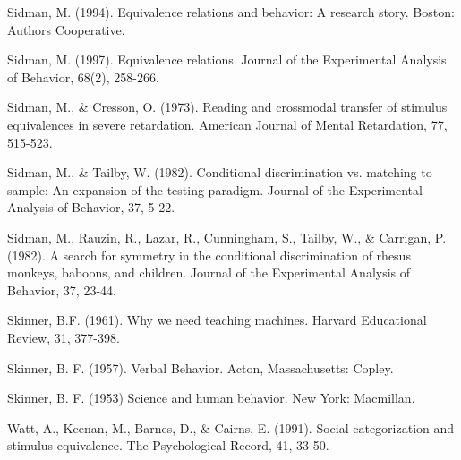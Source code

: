 \hangindent=25pt
\noindent Sidman, M. (1994). Equivalence relations and behavior: A research story. Boston: Authors Cooperative.

\hangindent=25pt
\noindent Sidman, M. (1997). Equivalence relations. Journal of the Experimental Analysis of Behavior, 68(2), 258-266.

\hangindent=25pt
\noindent Sidman, M., \& Cresson, O. (1973). Reading and crossmodal transfer of stimulus equivalences in severe retardation. American Journal of Mental Retardation, 77, 515-523.

\hangindent=25pt
\noindent Sidman, M., \& Tailby, W. (1982). Conditional discrimination vs. matching to sample: An expansion of the testing paradigm. Journal of the Experimental Analysis of Behavior, 37, 5-22.

\hangindent=25pt
\noindent Sidman, M., Rauzin, R., Lazar, R., Cunningham, S., Tailby, W., \& Carrigan, P. (1982). A search for symmetry in the conditional discrimination of rhesus monkeys, baboons, and children. Journal of the Experimental Analysis of Behavior, 37, 23-44.

\hangindent=25pt
\noindent Skinner, B.F. (1961). Why we need teaching machines. Harvard Educational Review, 31, 377-398. 

\hangindent=25pt
\noindent Skinner, B. F. (1957). Verbal Behavior. Acton, Massachusetts: Copley.

\hangindent=25pt
\noindent Skinner, B. F. (1953) Science and human behavior. New York: Macmillan. 

\hangindent=25pt
\noindent Watt, A., Keenan, M., Barnes, D., \& Cairns, E. (1991). Social categorization and stimulus equivalence. The Psychological Record, 41, 33-50.